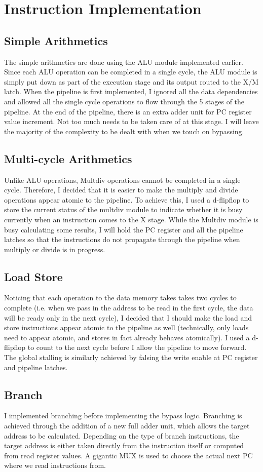 \documentclass{article}
\begin{document}
	\section{Instruction Implementation}
		\subsection{Simple Arithmetics}
		The simple arithmetics are done using the ALU module implemented earlier. Since each ALU operation can be completed in a single cycle, the ALU module is simply put down as part of the execution stage and its output routed to the X/M latch. When the pipeline is first implemented, I ignored all the data dependencies and allowed all the single cycle operations to flow through the 5 stages of the pipeline. At the end of the pipeline, there is an extra adder unit for PC register value increment. Not too much needs to be taken care of at this stage. I will leave the majority of the complexity to be dealt with when we touch on bypassing. 
		\subsection{Multi-cycle Arithmetics}
		Unlike ALU operations, Multdiv operations cannot be completed in a single cycle. Therefore, I decided that it is easier to make the multiply and divide operations appear atomic to the pipeline. To achieve this, I used a d-flipflop to store the current status of the multdiv module to indicate whether it is busy currently when an instruction comes to the X stage. While the Multdiv module is busy calculating some results, I will hold the PC register and all the pipeline latches so that the instructions do not propagate through the pipeline when multiply or divide is in progress. 
		\subsection{Load Store}
		Noticing that each operation to the data memory takes takes two cycles to complete (i.e. when we pass in the address to be read in the first cycle, the data will be ready only in the next cycle), I decided that I should make the load and store instructions appear atomic to the pipeline as well (technically, only loads need to appear atomic, and stores in fact already behaves atomically). I used a d-flipflop to count to the next cycle before I allow the pipeline to move forward. The global stalling is similarly achieved by falsing the write enable at PC register and pipeline latches.
		\subsection{Branch}
		I implemented branching before implementing the bypass logic. Branching is achieved through the addition of a new full adder unit, which allows the target address to be calculated. Depending on the type of branch instructions, the target address is either taken directly from the instruction itself or computed from read register values. A gigantic MUX is used to choose the actual next PC where we read instructions from.
\end{document}
